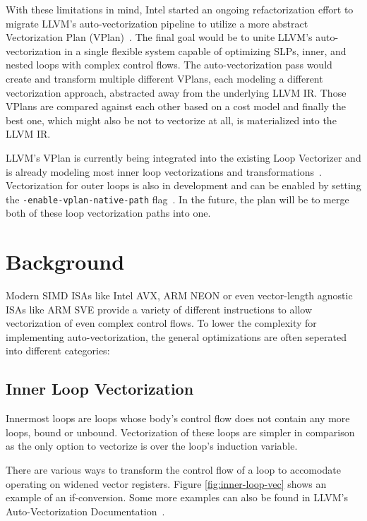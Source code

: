 \documentclass[sigplan,11pt,nonacm]{acmart}
\begin{document}
With these limitations in mind, Intel started an ongoing refactorization effort to migrate LLVM's
auto-vectorization pipeline to utilize a more abstract Vectorization Plan 
(VPlan)~\cite{llvmextloopvec,llvmvplan}. The final goal would be to unite LLVM's auto-vectorization
in a single flexible system capable of optimizing SLPs, inner, and nested loops with complex 
control flows. The auto-vectorization pass would create and transform multiple different 
VPlans, each modeling a different vectorization approach, abstracted away from the underlying LLVM IR.
Those VPlans are compared against each other based on a cost model and finally the best one, which
might also be not to vectorize at all, is materialized into the LLVM IR.

LLVM's VPlan is currently being integrated into the existing Loop Vectorizer and is
already modeling most inner loop vectorizations and transformations~\cite{llvmvplanupdate}. 
Vectorization for outer loops is also in development and can be enabled by setting 
the \texttt{-enable-vplan-native-path} flag~\cite{llvmouterloop}. In the future, the plan will 
be to merge both of these loop vectorization paths into one.




\section{Background}
\label{sec:background}
Modern SIMD ISAs like Intel AVX, ARM NEON or even vector-length agnostic ISAs like ARM SVE provide
a variety of different instructions to allow vectorization of even complex control flows. To lower
the complexity for implementing auto-vectorization, the general optimizations are often seperated
into different categories:

\subsection{Inner Loop Vectorization}
Innermost loops are loops whose body's control flow does not contain any more loops, bound or unbound.
Vectorization of these loops are simpler in comparison as the only option to vectorize is over the
loop's induction variable.

There are various ways to transform the control flow of a loop to accomodate operating on widened
vector registers. Figure \ref{fig:inner-loop-vec} shows an example of an if-conversion. Some more
examples can also be found in LLVM's Auto-Vectorization Documentation~\cite{llvmvec}.
\end{document}
